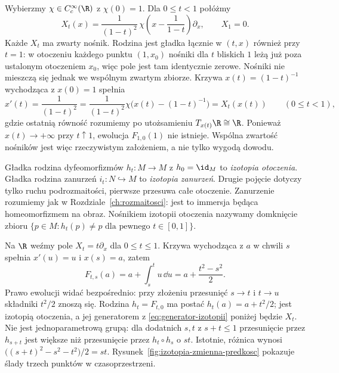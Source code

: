 \begin{przyklad}
Wybierzmy $\chi\in C_c^\infty(\R)$ z $\chi(0)=1$.
Dla $0\le t<1$ połóżmy
\[
X_t(x)=\frac{1}{(1-t)^2}\,
\chi\!\left(x-\frac{1}{1-t}\right)\partial_x,
\qquad X_1=0.
\]
Każde $X_t$ ma zwarty nośnik. Rodzina jest gładka łącznie
w $(t,x)$ również przy $t=1$: w otoczeniu każdego punktu
$(1,x_0)$ nośniki dla $t$ bliskich $1$ leżą już poza ustalonym
otoczeniem $x_0$, więc pole jest tam identycznie zerowe.
Nośniki nie mieszczą się jednak we wspólnym zwartym zbiorze.
Krzywa $x(t)=(1-t)^{-1}$ wychodząca z $x(0)=1$ spełnia
\[
x'(t)=\frac{1}{(1-t)^2}
=\frac{1}{(1-t)^2}\chi\bigl(x(t)-(1-t)^{-1}\bigr)
=X_t(x(t))
\qquad(0\le t<1),
\]
gdzie ostatnią równość rozumiemy po utożsamieniu
$T_{x(t)}\R\cong\R$. Ponieważ $x(t)\to+\infty$ przy $t\uparrow1$,
ewolucja $F_{1,0}(1)$ nie istnieje. Wspólna zwartość nośników
jest więc rzeczywistym założeniem, a nie tylko wygodą dowodu.
\end{przyklad}

\begin{definicja}
Gładka rodzina dyfeomorfizmów $h_t\colon M\to M$ z
$h_0=\id_M$ to \emph{izotopia otoczenia}.
Gładka rodzina zanurzeń $i_t\colon N\hookrightarrow M$ to
\emph{izotopia zanurzeń}. Drugie pojęcie dotyczy tylko ruchu
podrozmaitości, pierwsze przesuwa całe otoczenie.
Zanurzenie rozumiemy jak w Rozdziale~\ref{ch:rozmaitosci}:
jest to immersja będąca homeomorfizmem na obraz.
Nośnikiem izotopii otoczenia nazywamy domknięcie zbioru
$\{p\in M:h_t(p)\ne p\text{ dla pewnego }t\in[0,1]\}$.
\end{definicja}

\begin{przyklad}
Na $\R$ weźmy pole $X_t=t\partial_x$ dla $0\le t\le1$.
Krzywa wychodząca z $a$ w chwili $s$ spełnia
$x'(u)=u$ i $x(s)=a$, zatem
\[
F_{t,s}(a)=a+\int_s^t u\,\dd u
=a+\frac{t^2-s^2}{2}.
\]
Prawo ewolucji widać bezpośrednio: przy złożeniu przesunięć
$s\to t$ i $t\to u$ składniki $t^2/2$ znoszą się.
Rodzina $h_t=F_{t,0}$ ma postać $h_t(a)=a+t^2/2$;
jest izotopią otoczenia, a jej generatorem z
\eqref{eq:generator-izotopii} poniżej będzie $X_t$.
Nie jest jednoparametrową grupą: dla dodatnich $s,t$ z
$s+t\le1$ przesunięcie przez $h_{s+t}$ jest większe niż
przesunięcie przez $h_t\circ h_s$ o $st$.
Istotnie, różnica wynosi
$\bigl((s+t)^2-s^2-t^2\bigr)/2=st$.
Rysunek~\ref{fig:izotopia-zmienna-predkosc} pokazuje ślady
trzech punktów w czasoprzestrzeni.
\end{przyklad}

